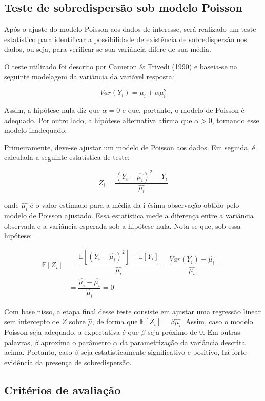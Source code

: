 \documentclass[
  twocolumn]{article}
\begin{document}
\subsection{Teste de sobredispersão sob modelo
Poisson}\label{teste-de-sobredispersuxe3o-sob-modelo-poisson}

Após o ajuste do modelo Poisson aos dados de interesse, será realizado
um teste estatístico para identificar a possibilidade de existência de
sobredispersão nos dados, ou seja, para verificar se sua variância
difere de sua média.

O teste utilizado foi descrito por Cameron \& Trivedi (1990) e baseia-se
na seguinte modelagem da variância da variável resposta:

\[
Var(Y_i) = \mu_i + \alpha \mu_i^2
\]

Assim, a hipótese nula diz que \(\alpha = 0\) e que, portanto, o modelo
de Poisson é adequado. Por outro lado, a hipótese alternativa afirma que
\(\alpha > 0\), tornando esse modelo inadequado.

Primeiramente, deve-se ajustar um modelo de Poisson aos dados. Em
seguida, é calculada a seguinte estatística de teste:

\[
Z_i = \dfrac{(Y_i - \hat{\mu_i})^2 - Y_i}{\hat{\mu_i}}
\]

onde \(\hat{\mu_i}\) é o valor estimado para a média da i-ésima
observação obtido pelo modelo de Poisson ajustado. Essa estatística mede
a diferença entre a variância observada e a variância esperada sob a
hipótese nula. Nota-se que, sob essa hipótese:

\[
\begin{aligned}
\mathbb{E}[Z_i] &= \dfrac{\mathbb{E}[(Y_i - \hat{\mu_i})^2] - \mathbb{E}[Y_i]}{\hat{\mu_i}} = \dfrac{Var(Y_i) - \hat{\mu_i}}{\hat{\mu_i}} = \\ &= \dfrac{\hat{\mu_i} - \hat{\mu_i}}{\hat{\mu_i}} = 0
\end{aligned}
\]

Com base nisso, a etapa final desse teste consiste em ajustar uma
regressão linear sem intercepto de \(Z\) sobre \(\hat{\mu}\), de forma
que \(\mathbb{E}[Z_i] = \beta \hat{\mu_i}\). Assim, caso o modelo
Poisson seja adequado, a expectativa é que \(\beta\) seja próximo de
\(0\). Em outras palavras, \(\beta\) aproxima o parâmetro \(\alpha\) da
parametrização da variância descrita acima. Portanto, caso \(\beta\)
seja estatisticamente significativo e positivo, há forte evidência da
presença de sobredispersão.

\subsection{Critérios de
avaliação}\label{crituxe9rios-de-avaliauxe7uxe3o}
\end{document}
